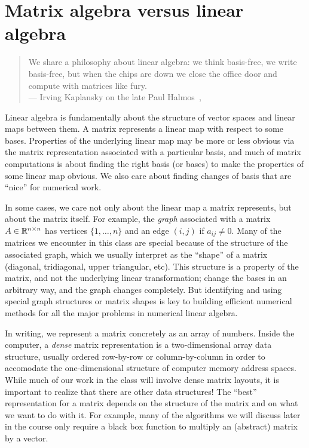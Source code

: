 \section{Matrix algebra versus linear algebra}

\begin{quotation}
  We share a philosophy about linear algebra: we think basis-free, we write basis-free, but when the chips are down we close the office door and compute with matrices like fury. \\
  \hspace*{\fill} --- Irving Kaplansky
  on the late Paul Halmos~\cite{Ewing:1991:Halmos},
\end{quotation}

Linear algebra is fundamentally about the structure of vector spaces
and linear maps between them.  A matrix represents a linear map with
respect to some bases.  Properties of the underlying linear map may
be more or less obvious via the matrix representation associated with
a particular basis, and much of matrix computations is about finding
the right basis (or bases) to make the properties of some linear map
obvious.  We also care about finding changes of basis that are ``nice''
for numerical work.

In some cases, we care not only about the linear map a matrix
represents, but about the matrix itself.  For example, the {\em graph}
associated with a matrix $A \in \mathbb{R}^{n \times n}$ has vertices $\{1,
\ldots, n\}$ and an edge $(i,j)$ if $a_{ij} \neq 0$.  Many of the
matrices we encounter in this class are special because of the structure
of the associated graph, which we usually interpret as the ``shape'' of
a matrix (diagonal, tridiagonal, upper triangular, etc).  This structure
is a property of the matrix, and not the underlying linear
transformation; change the bases in an arbitrary way, and the graph
changes completely.  But identifying and using special graph structures
or matrix shapes is key to building efficient numerical methods for all
the major problems in numerical linear algebra.

In writing, we represent a matrix concretely as an array of numbers.
Inside the computer, a {\em dense} matrix representation is a
two-dimensional array data structure, usually ordered row-by-row or
column-by-column in order to accomodate the one-dimensional structure of
computer memory address spaces.  While much of our work in the class
will involve dense matrix layouts, it is important to realize that there
are other data structures!  The ``best'' representation for a matrix
depends on the structure of the matrix and on what we want to do with
it.  For example, many of the algorithms we will discuss later in the
course only require a black box function to multiply an (abstract)
matrix by a vector.
